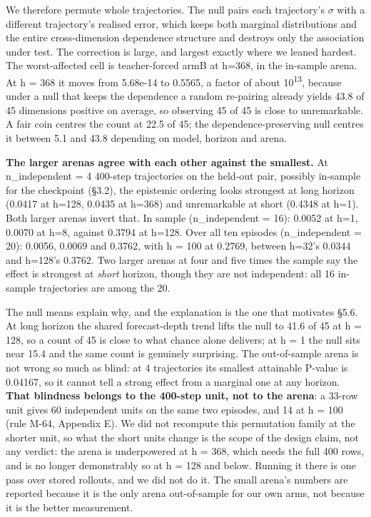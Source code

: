 \documentclass[10pt]{article}
\begin{document}
We therefore permute whole trajectories. The null pairs each trajectory's $\sigma$ with a different trajectory's realised error, which keeps both marginal distributions and the entire cross-dimension dependence structure and destroys only the association under test. The correction is large, and largest exactly where we leaned hardest. The worst-affected cell is teacher-forced armB at h=368, in the in-sample arena. At h = 368 it moves from 5.68e-14 to 0.5565, a factor of about 10\textsuperscript{13}, because under a null that keeps the dependence a random re-pairing already yields 43.8 of 45 dimensions positive on average, so observing 45 of 45 is close to unremarkable. A fair coin centres the count at 22.5 of 45; the dependence-preserving null centres it between 5.1 and 43.8 depending on model, horizon and arena.

\textbf{The larger arenas agree with each other against the smallest.} At n\_independent = 4 400-step trajectories on the held-out pair, possibly in-sample for the checkpoint (\S{}3.2), the epistemic ordering looks strongest at long horizon (0.0417 at h=128, 0.0435 at h=368) and unremarkable at short (0.4348 at h=1). Both larger arenas invert that. In sample (n\_independent = 16): 0.0052 at h=1, 0.0070 at h=8, against 0.3794 at h=128. Over all ten episodes (n\_independent = 20): 0.0056, 0.0069 and 0.3762, with h = 100 at 0.2769, between h=32's 0.0344 and h=128's 0.3762. Two larger arenas at four and five times the sample say the effect is strongest at \emph{short} horizon, though they are not independent: all 16 in-sample trajectories are among the 20.

The null means explain why, and the explanation is the one that motivates \S{}5.6. At long horizon the shared forecast-depth trend lifts the null to 41.6 of 45 at h = 128, so a count of 45 is close to what chance alone delivers; at h = 1 the null sits near 15.4 and the same count is genuinely surprising. The out-of-sample arena is not wrong so much as blind: at 4 trajectories its smallest attainable P-value is 0.04167, so it cannot tell a strong effect from a marginal one at any horizon. \textbf{That blindness belongs to the 400-step unit, not to the arena}: a 33-row unit gives 60 independent units on the same two episodes, and 14 at h = 100 (rule M-64, Appendix E). We did not recompute this permutation family at the shorter unit, so what the short units change is the scope of the design claim, not any verdict: the arena is underpowered at h = 368, which needs the full 400 rows, and is no longer demonstrably so at h = 128 and below. Running it there is one pass over stored rollouts, and we did not do it. The small arena's numbers are reported because it is the only arena out-of-sample for our own arms, not because it is the better measurement.
\end{document}

